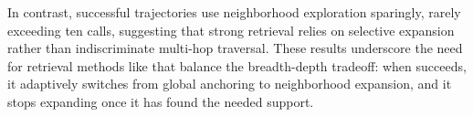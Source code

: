 In contrast, successful trajectories use neighborhood exploration sparingly, rarely exceeding ten calls, suggesting that strong retrieval relies on selective expansion rather than indiscriminate multi-hop traversal. These results underscore the need for retrieval methods like \retrieverShort that balance the breadth-depth tradeoff: when \retrieverShort succeeds, it adaptively switches from global anchoring to neighborhood expansion, and it stops expanding once it has found the needed support.
